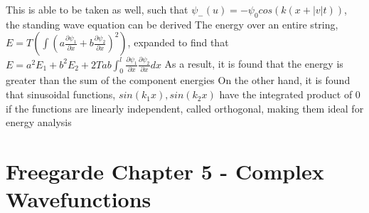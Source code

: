 \documentclass[11 pt, twoside]{article}
\newenvironment{outline*}
{
	\begin{outline}[enumerate]
	}
	{\end{outline}
}
\begin{document}
\begin{outline*}
\4 This is able to be taken as well, such that $\psi_-(u) = -\psi_0 cos(k(x + |v|t))$, the standing wave equation can be derived
\2 The energy over an entire string, $E = T(\int (a\frac{\partial \psi_1}{\partial x} + b\frac{\partial \psi_2}{\partial x})^2)$, expanded to find that $E = a^2E_1 + b^2E_2 + 2Tab\int^l_0 \frac{\partial \psi_1}{\partial x}\frac{\partial \psi_2}{\partial x}dx$
\3 As a result, it is found that the energy is greater than the sum of the component energies
\3 On the other hand, it is found that sinusoidal functions, $sin(k_1x), sin(k_2x)$ have the integrated product of 0 if the functions are linearly independent, called orthogonal, making them ideal for energy analysis
\end{outline*}
\section{Freegarde Chapter 5 - Complex Wavefunctions}
\end{document}
